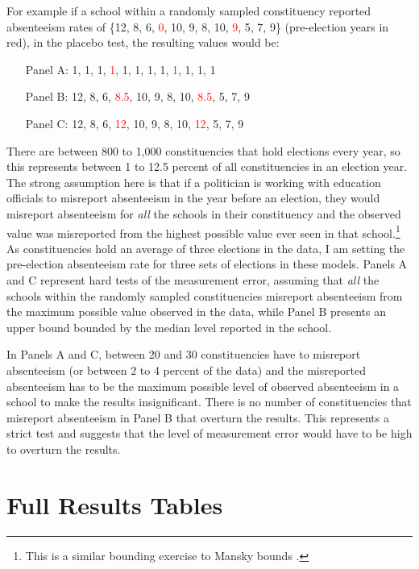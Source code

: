 \documentclass[hidelinks, 12pt, article, oneside]{memoir}
\begin{document}
For example if a school within a randomly sampled constituency reported absenteeism rates of \{12, 8, 6, \textcolor{red}{0}, 10, 9, 8, 10, \textcolor{red}{9}, 5, 7, 9\} (pre-election years in red), in the placebo test, the resulting values would be:

\begin{enumerate} \itemsep -2pt
    \item[Panel A:] {1, 1, 1, \textcolor{red}{1}, 1, 1, 1, 1, \textcolor{red}{1}, 1, 1, 1}
    \item[Panel B:] {12, 8, 6, \textcolor{red}{8.5}, 10, 9, 8, 10, \textcolor{red}{8.5}, 5, 7, 9}
    \item[Panel C:] {12, 8, 6, \textcolor{red}{12}, 10, 9, 8, 10, \textcolor{red}{12}, 5, 7, 9}
\end{enumerate}

There are between 800 to 1,000 constituencies that hold elections every year, so this represents between 1 to 12.5 percent of all constituencies in an election year. The strong assumption here is that if a politician is working with education officials to misreport absenteeism in the year before an election, they would misreport absenteeism for \emph{all} the schools in their constituency and the observed value was misreported from the highest possible value ever seen in that school.\footnote{This is a similar bounding exercise to Mansky bounds \citep{Horowitz2000a}.}  As constituencies hold an average of three elections in the data, I am setting the pre-election absenteeism rate for three sets of elections in these models. Panels A and C represent hard tests of the measurement error, assuming that \emph{all} the schools within the randomly sampled constituencies misreport absenteeism from the maximum possible value observed in the data, while Panel B presents an upper bound bounded by the median level reported in the school.

In Panels A and C, between 20 and 30 constituencies have to misreport absenteeism (or between 2 to 4 percent of the data) and the misreported absenteeism has to be the maximum possible level of observed absenteeism in a school to make the results insignificant.  There is no number of constituencies that misreport absenteeism in Panel B that overturn the results. This represents a strict test and suggests that the level of measurement error would have to be high to overturn the results.

\clearpage

\section{Full Results Tables}
\end{document}
